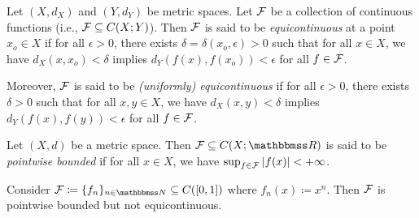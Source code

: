 \documentclass[screen,single]{techreport}
\numberwithin{equation}{section}
\begin{document}
\begin{definition}\label{De:Equicont}
  Let $(X,d_X)$ and $(Y,d_Y)$ be metric spaces.
  Let $\mathcal{F}$ be a collection of continuous functions (i.e., $\mathcal{F} \subseteq C(X;Y)$).
  Then $\mathcal{F}$ is said to be \emph{equicontinuous} at a point $x_o \in X$ if for all $\epsilon > 0$, there exists $\delta = \delta(x_o,\epsilon) > 0$ such that for all $x \in X$, we have $d_X(x,x_o) < \delta$ implies $d_Y(f(x),f(x_o)) < \epsilon$ for all $f \in \mathcal{F}$.
  
  Moreover, $\mathcal{F}$ is said to be \emph{(uniformly) equicontinuous} if for all $\epsilon > 0$, there exists $\delta > 0$ such that for all $x,y \in X$, we have $d_X(x,y) < \delta$ implies $d_Y(f(x),f(y)) < \epsilon$ for all $f \in \mathcal{F}$.
\end{definition}

\begin{definition}\label{De:PointwiseBounded}
  Let $(X,d)$ be a metric space.
  Then $\calF \subseteq C(X;\bbR)$ is said to be \emph{pointwise bounded} if for all $x \in X$, we have $\sup_{f \in \mathcal{F}} |f(x)| < +\infty$.
\end{definition}

\begin{remark}\label{Rem:PointBoundedButNotEquicont}
  Consider $\calF \coloneqq \{ f_n\}_{n \in \bbN} \subseteq C([0,1])$ where $f_n(x) \coloneqq x^n$.
  Then $\mathcal{F}$ is pointwise bounded but not equicontinuous.
\end{remark}
\end{document}
